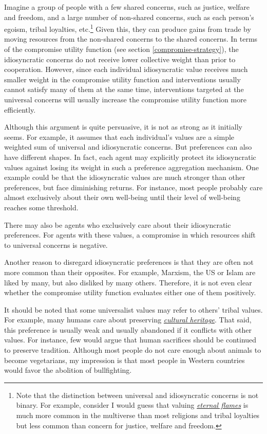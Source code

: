 Imagine a group of people with a few shared concerns, such as justice,
welfare and freedom, and a large number of non-shared concerns, such as
each person's egoism, tribal loyalties, etc.\footnote{Note that the
  distinction between universal and idiosyncratic concerns is not
  binary. For example, consider I would guess that valuing
  \href{https://en.wikipedia.org/wiki/Eternal_flame}{\emph{eternal
  flames}} is much more common in the multiverse than most religions and
  tribal loyalties but less common than concern for justice, welfare and
  freedom.} Given this, they can produce gains from trade by moving
resources from the non-shared concerns to the shared concerns. In terms
of the compromise utility function (see section
\ref{compromise-strategy}), the idiosyncratic concerns do not receive lower
collective weight than prior to cooperation. However, since each
individual idiosyncratic value receives much smaller weight in the
compromise utility function and interventions usually cannot satisfy
many of them at the same time, interventions targeted at the universal
concerns will usually increase the compromise utility function more
efficiently.

Although this argument is quite persuasive, it is not as strong as it
initially seems. For example, it assumes that each individual's values
are a simple weighted sum of universal and idiosyncratic concerns. But
preferences can also have different shapes. In fact, each agent may
explicitly protect its idiosyncratic values against losing its weight in
such a preference aggregation mechanism. One example could be that the
idiosyncratic values are much stronger than other preferences, but face
diminishing returns. For instance, most people probably care almost
exclusively about their own well-being until their level of well-being
reaches some threshold.

There may also be agents who exclusively care about their idiosyncratic
preferences. For agents with these values, a compromise in which
resources shift to universal concerns is negative.

Another reason to disregard idiosyncratic preferences is that they are
often not more common than their opposites. For example, Marxism, the US
or Islam are liked by many, but also disliked by many others. Therefore,
it is not even clear whether the compromise utility function evaluates
either one of them positively.

It should be noted that some universalist values may refer to others'
tribal values. For example, many humans care about preserving
\href{https://en.wikipedia.org/wiki/Cultural_heritage}{\emph{cultural
heritage}}. That said, this preference is usually weak and usually
abandoned if it conflicts with other values. For instance, few would
argue that human sacrifices should be continued to preserve tradition.
Although most people do not care enough about animals to become
vegetarians, my impression is that most people in Western countries
would favor the abolition of bullfighting.

